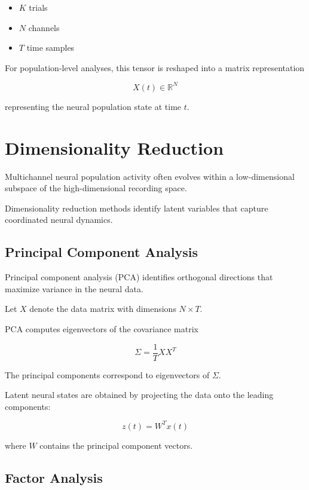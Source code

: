 \documentclass[11pt]{report}
\begin{document}
\begin{itemize}
\item $K$ trials
\item $N$ channels
\item $T$ time samples
\end{itemize}

For population-level analyses, this tensor is reshaped into a
matrix representation

\begin{equation}
X(t) \in \mathbb{R}^{N}
\end{equation}

representing the neural population state at time $t$.

\chapter{Dimensionality Reduction}

Multichannel neural population activity often evolves within a
low-dimensional subspace of the high-dimensional recording space.

Dimensionality reduction methods identify latent variables that
capture coordinated neural dynamics.

\section{Principal Component Analysis}

Principal component analysis (PCA) identifies orthogonal directions
that maximize variance in the neural data.

Let $X$ denote the data matrix with dimensions $N \times T$.

PCA computes eigenvectors of the covariance matrix

\begin{equation}
\Sigma =
\frac{1}{T} XX^T
\end{equation}

The principal components correspond to eigenvectors of $\Sigma$.

Latent neural states are obtained by projecting the data onto the
leading components:

\begin{equation}
z(t) = W^T x(t)
\end{equation}

where $W$ contains the principal component vectors.

\section{Factor Analysis}
\end{document}
